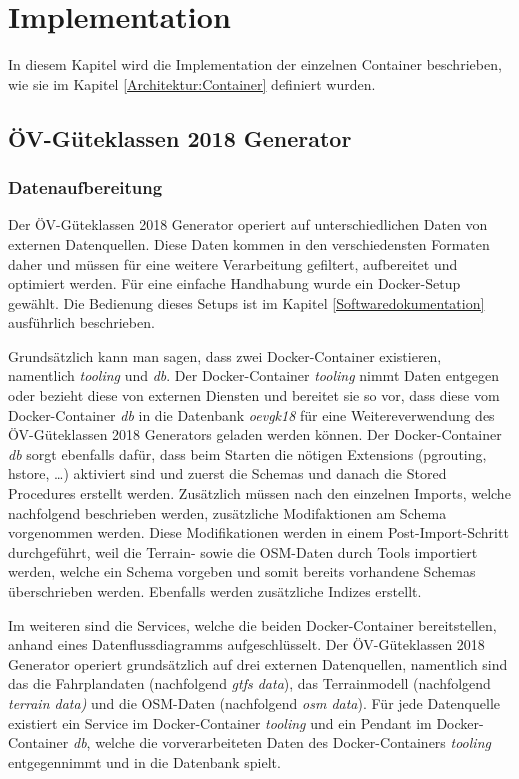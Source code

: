 
\section{Implementation}
\label{Implementation}

In diesem Kapitel wird die Implementation der einzelnen Container beschrieben, wie sie im Kapitel \ref{Architektur:Container} definiert wurden.

\subsection{ÖV-Güteklassen 2018 Generator}
\label{Implementation:ÖV-Güteklassen 2018 Generator}

\subsubsection{Datenaufbereitung}
\label{ÖV-Güteklassen 2018 Generator:Datenaufbereitung}

Der \acs{ÖV}-Güteklassen 2018 Generator operiert auf unterschiedlichen Daten von externen Datenquellen.
Diese Daten kommen in den verschiedensten Formaten daher und müssen für eine weitere Verarbeitung gefiltert, aufbereitet und optimiert werden.
Für eine einfache Handhabung wurde ein Docker-Setup gewählt.
Die Bedienung dieses Setups ist im Kapitel \ref{Softwaredokumentation} ausführlich beschrieben.

Grundsätzlich kann man sagen, dass zwei Docker-Container existieren, namentlich \emph{tooling} und \emph{db}.
Der Docker-Container \emph{tooling} nimmt Daten entgegen oder bezieht diese von externen Diensten und bereitet sie so vor, dass diese vom Docker-Container \emph{db} in die Datenbank \emph{oevgk18} für eine Weitereverwendung des \acs{ÖV}-Güteklassen 2018 Generators geladen werden können.
Der Docker-Container \emph{db} sorgt ebenfalls dafür, dass beim Starten die nötigen Extensions (pgrouting, hstore, \dots) aktiviert sind und zuerst die Schemas und danach die Stored Procedures erstellt werden.
Zusätzlich müssen nach den einzelnen Imports, welche nachfolgend beschrieben werden, zusätzliche Modifaktionen am Schema vorgenommen werden.
Diese Modifikationen werden in einem Post-Import-Schritt durchgeführt, weil die Terrain- sowie die OSM-Daten durch Tools importiert werden, welche ein Schema vorgeben und somit bereits vorhandene Schemas überschrieben werden.
Ebenfalls werden zusätzliche Indizes erstellt.

Im weiteren sind die Services, welche die beiden Docker-Container bereitstellen, anhand eines Datenflussdiagramms aufgeschlüsselt.
Der \acs{ÖV}-Güteklassen 2018 Generator operiert grundsätzlich auf drei externen Datenquellen, namentlich sind das die Fahrplandaten (nachfolgend \emph{gtfs data}), das Terrainmodell (nachfolgend \emph{terrain data)} und die \acs{OSM}-Daten (nachfolgend \emph{osm data}).
Für jede Datenquelle existiert ein Service im Docker-Container \emph{tooling} und ein Pendant im Docker-Container \emph{db}, welche die vorverarbeiteten Daten des Docker-Containers \emph{tooling} entgegennimmt und in die Datenbank spielt.

